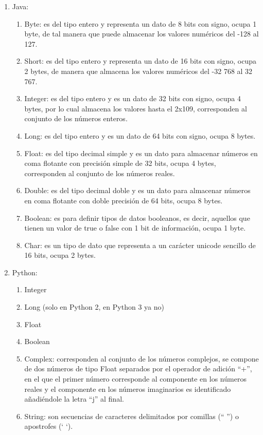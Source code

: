 \documentclass{article}
\begin{document}
\begin{enumerate}
	\item Java:
	\begin{enumerate}
		\item Byte: es del tipo entero y representa un dato de 8 bits con signo, ocupa 1 byte, de tal manera que puede almacenar los valores numéricos del -128 al 127.
		\item Short: es del tipo entero y representa un dato de 16 bits con signo, ocupa 2 bytes, de manera que almacena los valores numéricos del -32 768 al 32 767.
		\item Integer: es del tipo entero y es un dato de 32 bits con signo, ocupa 4 bytes, por lo cual almacena los valores hasta el 2x109, corresponden al conjunto de los números enteros. 
		\item Long: es del tipo entero y es un dato de 64 bits con signo, ocupa 8 bytes.
		\item Float: es del tipo decimal simple y es un dato para almacenar números en coma flotante con precisión simple de 32 bits, ocupa 4 bytes, corresponden al conjunto de los números reales. 
		\item Double: es del tipo decimal doble y es un dato para almacenar números en coma flotante con doble precisión de 64 bits, ocupa 8 bytes.
		\item Boolean: es para definir tipos de datos booleanos, es decir, aquellos que tienen un valor de true o false con 1 bit de información, ocupa 1 byte.
		\item Char: es un tipo de dato que representa a un carácter unicode sencillo de 16 bits, ocupa 2 bytes. 
	\end{enumerate}
	\item Python:
	\begin{enumerate}
		\item Integer
		\item Long (solo en Python 2, en Python 3 ya no)
		\item Float 
		\item Boolean 
		\item Complex: corresponden al conjunto de los números complejos, se compone de dos números de tipo Float separados por el operador de adición “+”, en el que el primer número corresponde al componente en los números reales y el componente en los números imaginarios es identificado añadiéndole la letra “j” al final.  
		\item String: son secuencias de caracteres delimitados por comillas (“ ”) o apostrofes (‘ ‘).

\end{enumerate}
\end{enumerate}
\end{document}
